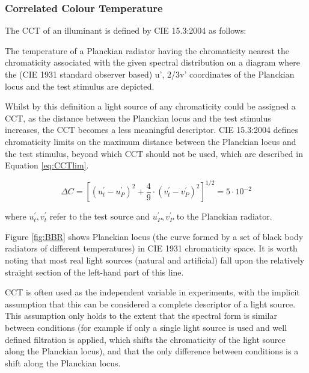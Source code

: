 \subsubsection{Correlated Colour Temperature}

The \acrfull{CCT} of an illuminant is defined by CIE 15.3:2004 \citep{cie_cie_2004-2} as follows:

\begin{itquote}{}
The temperature of a Planckian radiator having the chromaticity nearest the chromaticity associated with the given spectral distribution on a diagram where the (CIE 1931 standard observer based) u', 2/3v' coordinates of the Planckian locus and the test stimulus are depicted.
\end{itquote}

Whilst by this definition a light source of any chromaticity could be assigned a \gls{CCT}, as the distance between the Planckian locus and the test stimulus increases, the \gls{CCT} becomes a less meaningful descriptor. CIE 15.3:2004 \citep{cie_cie_2004-2} defines chromaticity limits on the maximum distance between the Planckian locus and the test stimulus, beyond which \gls{CCT} should not be used, which are described in Equation \ref{eq:CCTlim}.

\begin{equation}
\Delta C=\left[\left(u_{t}^{\prime}-u_{P}^{\prime}\right)^{2}+\frac{4}{9} \cdot\left(v_{t}^{\prime}-v_{P}^{\prime}\right)^{2}\right]^{1 / 2}=5 \cdot 10^{-2}
\label{eq:CCTlim}
\end{equation}

where $u^{\prime}_{t}, v^{\prime}_{t}$ refer to the test source and $u^{\prime}_{P}, v^{\prime}_{P}$ to the Planckian radiator.

Figure \ref{fig:BBR} shows Planckian locus (the curve formed by a set of black body radiators of different temperatures) in \gls{CIE} 1931 chromaticity space. It is worth noting that most real light sources (natural and artificial) fall upon the relatively straight section of the left-hand part of this line.

\gls{CCT} is often used as the independent variable in experiments, with the implicit assumption that this can be considered a complete descriptor of a light source. This assumption only holds to the extent that the spectral form is similar between conditions (for example if only a single light source is used and well defined filtration is applied, which shifts the chromaticity of the light source along the Planckian locus), and that the only difference between conditions is a shift along the Planckian locus. 

